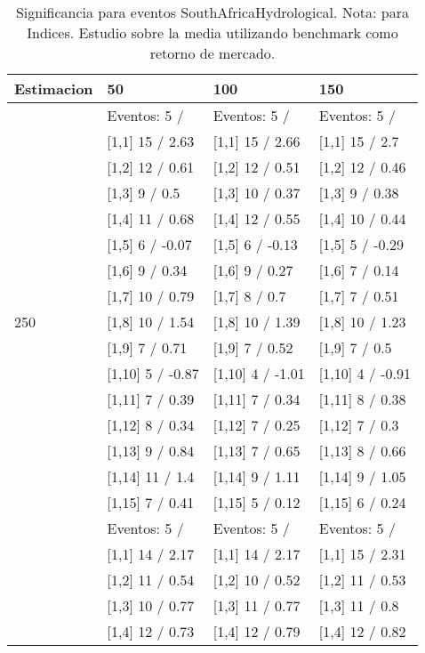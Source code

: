 \begin{table}

\caption{Significancia para eventos SouthAfricaHydrological. Nota: para Indices. Estudio sobre la media utilizando benchmark como retorno de mercado.}
\centering
\begin{tabular}[t]{llll}
\toprule
Estimacion & 50 & 100 & 150\\
\midrule
 & Eventos:  5 / & Eventos:  5 / & Eventos:  5 /\\
 & {}[1,1] 15  / 2.63 & {}[1,1] 15  / 2.66 & {}[1,1] 15  / 2.7\\
 & {}[1,2] 12  / 0.61 & {}[1,2] 12  / 0.51 & {}[1,2] 12  / 0.46\\
 & {}[1,3] 9  / 0.5 & {}[1,3] 10  / 0.37 & {}[1,3] 9  / 0.38\\
 & {}[1,4] 11  / 0.68 & {}[1,4] 12  / 0.55 & {}[1,4] 10  / 0.44\\
\addlinespace
 & {}[1,5] 6  / -0.07 & {}[1,5] 6  / -0.13 & {}[1,5] 5  / -0.29\\
 & {}[1,6] 9  / 0.34 & {}[1,6] 9  / 0.27 & {}[1,6] 7  / 0.14\\
 & {}[1,7] 10  / 0.79 & {}[1,7] 8  / 0.7 & {}[1,7] 7  / 0.51\\
250 & {}[1,8] 10  / 1.54 & {}[1,8] 10  / 1.39 & {}[1,8] 10  / 1.23\\
 & {}[1,9] 7  / 0.71 & {}[1,9] 7  / 0.52 & {}[1,9] 7  / 0.5\\
\addlinespace
 & {}[1,10] 5  / -0.87 & {}[1,10] 4  / -1.01 & {}[1,10] 4  / -0.91\\
 & {}[1,11] 7  / 0.39 & {}[1,11] 7  / 0.34 & {}[1,11] 8  / 0.38\\
 & {}[1,12] 8  / 0.34 & {}[1,12] 7  / 0.25 & {}[1,12] 7  / 0.3\\
 & {}[1,13] 9  / 0.84 & {}[1,13] 7  / 0.65 & {}[1,13] 8  / 0.66\\
 & {}[1,14] 11  / 1.4 & {}[1,14] 9  / 1.11 & {}[1,14] 9  / 1.05\\
\addlinespace
 & {}[1,15] 7  / 0.41 & {}[1,15] 5  / 0.12 & {}[1,15] 6  / 0.24\\
 & Eventos:  5 / & Eventos:  5 / & Eventos:  5 /\\
 & {}[1,1] 14  / 2.17 & {}[1,1] 14  / 2.17 & {}[1,1] 15  / 2.31\\
 & {}[1,2] 11  / 0.54 & {}[1,2] 10  / 0.52 & {}[1,2] 11  / 0.53\\
 & {}[1,3] 10  / 0.77 & {}[1,3] 11  / 0.77 & {}[1,3] 11  / 0.8\\
\addlinespace
 & {}[1,4] 12  / 0.73 & {}[1,4] 12  / 0.79 & {}[1,4] 12  / 0.82\\

\end{tabular}
\end{table}

